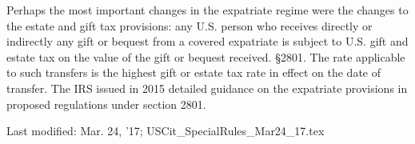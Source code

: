  Perhaps the most important changes in the expatriate regime were the changes to the estate and gift tax provisions:  any U.S. person who receives directly or indirectly any gift or bequest from a covered expatriate is subject to U.S. gift and estate tax on the value of the gift or bequest received. \S2801.  The rate applicable to such transfers is the highest gift or estate tax rate in effect on the date of transfer.  The IRS issued in 2015 detailed guidance on the expatriate provisions in proposed regulations under section 2801.  
 
 \begin{framed}
 Last modified: Mar. 24, '17; USCit\_SpecialRules\_Mar24\_17.tex
 \end{framed}
 